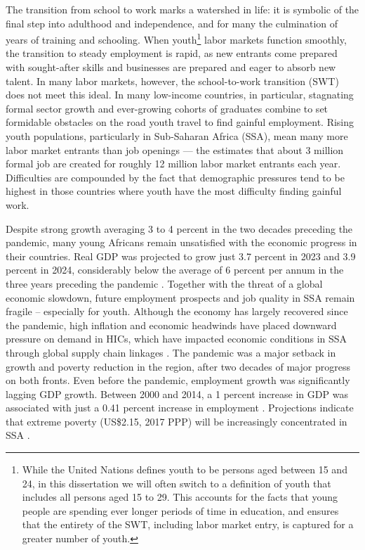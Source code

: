 \documentclass[
  a4paper, twoside, 12pt]{book}
\begin{document}
The transition from school to work marks a watershed in life: it is symbolic of the final step into adulthood and independence, and for many the culmination of years of training and schooling. When youth\footnote{While the United Nations defines youth to be persons aged between 15 and 24, in this dissertation we will often switch to a definition of youth that includes all persons aged 15 to 29. This accounts for the facts that young people are spending ever longer periods of time in education, and ensures that the entirety of the SWT, including labor market entry, is captured for a greater number of youth.} labor markets function smoothly, the transition to steady employment is rapid, as new entrants come prepared with sought-after skills and businesses are prepared and eager to absorb new talent. In many labor markets, however, the school-to-work transition (SWT) does not meet this ideal. In many low-income countries, in particular, stagnating formal sector growth and ever-growing cohorts of graduates combine to set formidable obstacles on the road youth travel to find gainful employment. Rising youth populations, particularly in Sub-Saharan Africa (SSA), mean many more labor market entrants than job openings --- the \textcite{africandevelopmentbank2022} estimates that about 3 million formal job are created for roughly 12 million labor market entrants each year. Difficulties are compounded by the fact that demographic pressures tend to be highest in those countries where youth have the most difficulty finding gainful work.

Despite strong growth averaging 3 to 4 percent in the two decades preceding the pandemic, many young Africans remain unsatisfied with the economic progress in their countries. Real GDP was projected to grow just 3.7 percent in 2023 and 3.9 percent in 2024, considerably below the average of 6 percent per annum in the three years preceding the pandemic \autocite{africandevelopmentbank2023}. Together with the threat of a global economic slowdown, future employment prospects and job quality in SSA remain fragile -- especially for youth. Although the economy has largely recovered since the pandemic, high inflation and economic headwinds have placed downward pressure on demand in HICs, which have impacted economic conditions in SSA through global supply chain linkages \autocite{ilo2023}. The pandemic was a major setback in growth and poverty reduction in the region, after two decades of major progress on both fronts. Even before the pandemic, employment growth was significantly lagging GDP growth. Between 2000 and 2014, a 1 percent increase in GDP was associated with just a 0.41 percent increase in employment \autocite{africandevelopmentbank2019}. Projections indicate that extreme poverty (US\$2.15, 2017 PPP) will be increasingly concentrated in SSA \autocite{worldbank2022}.
\end{document}
